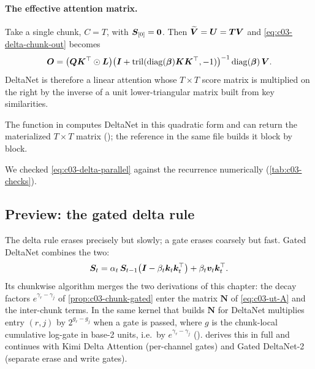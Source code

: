 \paragraph{The effective attention matrix.}
Take a single chunk, $C=T$, with $\bm{S}_{[0]}=\bm0$. Then $\widetilde{\bm{V}}=\bm{U}=\bm{T}\bm{V}$ and
\cref{eq:c03-delta-chunk-out} becomes
\begin{equation}\label{eq:c03-delta-parallel}
  \bm{O}=\big(\bm{Q}\bm{K}^{\top}\odot\bm{L}\big)\big(\bm{I}+\mathrm{tril}(\operatorname{diag}(\bm{\beta})\bm{K}\bm{K}^{\top},-1)\big)^{-1}\operatorname{diag}(\bm{\beta})\,\bm{V} .
\end{equation}
DeltaNet is therefore a linear attention whose $T\times T$ score matrix is multiplied on the
right by the inverse of a unit lower-triangular matrix built from key similarities.
\begin{sloppypar}
\noindent The function  in
 computes
DeltaNet in this quadratic form and can return the materialized $T\times T$ matrix
(); the reference  in the same file
builds it block by block.
\end{sloppypar}
\noindent We checked \cref{eq:c03-delta-parallel} against
the recurrence numerically (\cref{tab:c03-checks}).

\subsection{Preview: the gated delta rule}

The delta rule erases precisely but slowly; a gate erases coarsely but fast. Gated DeltaNet
\citep{yang2025gdn} combines the two:
\begin{equation}\label{eq:c03-gdn}
  \bm{S}_t=\alpha_t\,\bm{S}_{t-1}\big(\bm{I}-\beta_t\bm{k}_t\bm{k}_t^{\top}\big)+\beta_t\bm{v}_t\bm{k}_t^{\top} .
\end{equation}
Its chunkwise algorithm merges the two derivations of this chapter: the decay factors
$e^{\gamma_r-\gamma_j}$ of \cref{prop:c03-chunk-gated} enter the matrix $\bm{N}$ of
\cref{eq:c03-ut-A} and the inter-chunk terms. In \fla{} the same kernel that builds $\bm{N}$ for
DeltaNet multiplies entry $(r,j)$ by $2^{g_r-g_j}$ when a gate is passed, where $g$ is the
chunk-local cumulative log-gate in base-2 units, i.e.\ by $e^{\gamma_r-\gamma_j}$
().
 derives this in full and continues with Kimi Delta Attention (per-channel gates)
and Gated DeltaNet-2 (separate erase and write gates).

